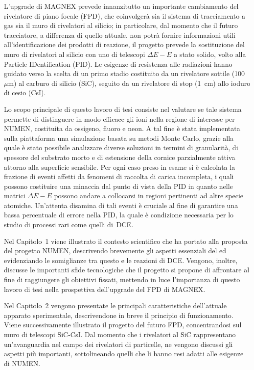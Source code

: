 L'upgrade di MAGNEX prevede innanzitutto un importante cambiamento del rivelatore di piano focale (FPD), che coinvolgerà sia il sistema di tracciamento a gas sia il muro di rivelatori al silicio; in particolare, dal momento che il futuro tracciatore, a differenza di quello attuale, non potrà fornire informazioni utili all'identificazione dei prodotti di reazione, il progetto prevede la sostituzione del muro di rivelatori al silicio con uno di telescopi $\Delta E - E$ a stato solido, volto alla Particle IDentification (PID). 
Le esigenze di resistenza alle radiazioni hanno guidato verso la scelta di un primo stadio costituito da un rivelatore sottile (100~$\mu$m) al carburo di silicio (SiC), seguito da un rivelatore di stop (1~cm) allo ioduro di cesio (CsI).

Lo scopo principale di questo lavoro di tesi consiste nel valutare se tale sistema permette di distinguere in modo efficace gli ioni nella regione di interesse per NUMEN, costituita da ossigeno, fluoro e neon.
A tal fine è stata implementata sulla piattaforma \geant{} una simulazione basata su metodi Monte Carlo, grazie alla quale è stato possibile analizzare diverse soluzioni in termini di granularità, di spessore del substrato morto e di estensione della cornice parzialmente attiva attorno alla superficie sensibile.
Per ogni caso preso in esame si è calcolata la frazione di eventi affetti da fenomeni di raccolta di carica incompleta, i quali possono costituire una minaccia dal punto di vista della PID in quanto nelle matrici $\Delta E - E$ possono andare a collocarsi in regioni pertinenti ad altre specie atomiche.
Un'attenta disamina di tali eventi è cruciale al fine di garantire una bassa percentuale di errore nella PID, la quale è condizione necessaria per lo studio di processi rari come quelli di~DCE.


Nel Capitolo~1 viene illustrato il contesto scientifico che ha portato alla proposta del progetto NUMEN, descrivendo brevemente gli aspetti essenziali del \doppiobeta{} ed evidenziando le somiglianze tra questo e le reazioni di DCE.
Vengono, inoltre, discusse le importanti sfide tecnologiche che il progetto si propone di affrontare al fine di raggiungere gli obiettivi fissati, mettendo in luce l'importanza di questo lavoro di tesi nella prospettiva dell'upgrade del FPD di MAGNEX.


Nel Capitolo~2 vengono presentate le principali caratteristiche dell'attuale apparato sperimentale, descrivendone in breve il principio di funzionamento.
Viene successivamente illustrato il progetto del futuro FPD, concentrandosi sul muro di telescopi SiC-CsI.
Dal momento che i rivelatori al SiC rappresentano un'avanguardia nel campo dei rivelatori di particelle, ne vengono discussi gli aspetti più importanti, sottolineando quelli che li hanno resi adatti alle esigenze di NUMEN.


